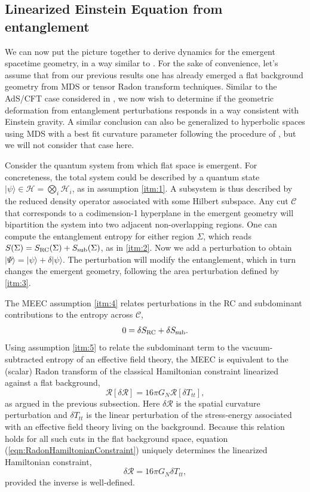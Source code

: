 \documentclass[%
preprint,
nofootinbib,
amsmath,amssymb,
aps,
prd,
showpacs,
superscriptaddress
]{revtex4-1}
\newcommand{\R}{\mathscr{R}}
\begin{document}
\subsection{Linearized Einstein Equation from entanglement}

We can now put the picture together to derive dynamics for the emergent spacetime geometry, in a way similar to \cite{Jacobson:2015hqa}.
For the sake of convenience, let's assume that from our previous results one has already emerged a flat background geometry from MDS or tensor Radon transform techniques. Similar to the AdS/CFT case considered in \cite{Faulkner:2013ica}, we now wish to determine if the geometric deformation from entanglement perturbations responds in a way consistent with Einstein gravity. 
A similar conclusion can also be generalized to hyperbolic spaces using MDS with a best fit curvature parameter following the procedure of \cite{Czech:2016tqr}, but we will not consider that case here. 

Consider the quantum system from which flat space is emergent. For concreteness, the total system could be described by a quantum state $|\psi\rangle\in\mathcal{H} = \bigotimes_i \mathcal{H}_i$, as in assumption \ref{itm:1}. A subsystem is thus described by the reduced density operator associated with some Hilbert subspace. Any cut $\mathcal{C}$ that corresponds to a codimension-1 hyperplane in the emergent geometry will bipartition the system into two adjacent non-overlapping regions. One can compute the entanglement entropy for either region $\Sigma$, which reads $S(\Sigma) = S_{\rm RC}(\Sigma) +S_{\rm sub}(\Sigma)$, as in \ref{itm:2}. Now we add a perturbation to obtain $|\Psi\rangle = |\psi\rangle + \delta |\psi\rangle$. The perturbation will modify the entanglement, which in turn changes the emergent geometry, following the area perturbation defined by \ref{itm:3}. 
 
The MEEC assumption \ref{itm:4} relates perturbations in the RC and subdominant contributions to the entropy across $\mathcal{C}$,
\begin{equation}
 0=\delta S_{\rm RC}+\delta S_{\rm sub}.
\end{equation}
Using assumption \ref{itm:5} to relate the subdominant term to the vacuum-subtracted entropy of an effective field theory, the MEEC is equivalent to the (scalar) Radon transform of the classical Hamiltonian constraint linearized against a flat background, 
\begin{equation}
\R[\delta \mathcal{R}]= 16\pi G_N \R[\delta T_{tt}],
\label{eqn:RadonHamiltonianConstraint}
\end{equation}
as argued in the previous subsection.
Here $\delta \mathcal{R}$ is the spatial curvature perturbation and $\delta T_{tt}$ is the linear perturbation of the stress-energy associated with an effective field theory living on the background. 
Because this relation holds for all such cuts in the flat background space, equation (\ref{eqn:RadonHamiltonianConstraint}) uniquely determines the linearized Hamiltonian constraint,
\begin{equation}
\delta\mathcal{R}= 16\pi G_N\delta T_{tt},
\label{eqn:HamiltonianConstraint}
\end{equation}
provided the inverse is well-defined. 
\end{document}
